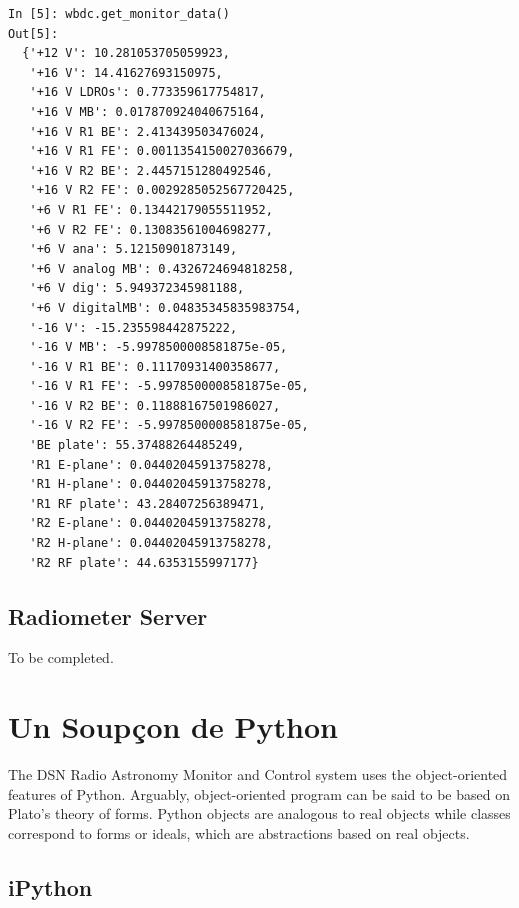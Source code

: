 \documentclass[letterpaper,11pt]{book}
\begin{document}
\begin{verbatim}
In [5]: wbdc.get_monitor_data()
Out[5]: 
  {'+12 V': 10.281053705059923,
   '+16 V': 14.41627693150975,
   '+16 V LDROs': 0.773359617754817,
   '+16 V MB': 0.017870924040675164,
   '+16 V R1 BE': 2.413439503476024,
   '+16 V R1 FE': 0.0011354150027036679,
   '+16 V R2 BE': 2.4457151280492546,
   '+16 V R2 FE': 0.0029285052567720425,
   '+6 V R1 FE': 0.13442179055511952,
   '+6 V R2 FE': 0.13083561004698277,
   '+6 V ana': 5.12150901873149,
   '+6 V analog MB': 0.4326724694818258,
   '+6 V dig': 5.949372345981188,
   '+6 V digitalMB': 0.04835345835983754,
   '-16 V': -15.235598442875222,
   '-16 V MB': -5.9978500008581875e-05,
   '-16 V R1 BE': 0.11170931400358677,
   '-16 V R1 FE': -5.9978500008581875e-05,
   '-16 V R2 BE': 0.11888167501986027,
   '-16 V R2 FE': -5.9978500008581875e-05,
   'BE plate': 55.37488264485249,
   'R1 E-plane': 0.04402045913758278,
   'R1 H-plane': 0.04402045913758278,
   'R1 RF plate': 43.28407256389471,
   'R2 E-plane': 0.04402045913758278,
   'R2 H-plane': 0.04402045913758278,
   'R2 RF plate': 44.6353155997177}\end{verbatim}


\section{Radiometer Server}

To be completed.

\appendix

\chapter{Un Soup\c{c}on de Python}\label{Python}

The DSN Radio Astronomy Monitor and Control system uses the object-oriented
features of Python.  Arguably, object-oriented program can be said to be based
on Plato's theory of forms.  Python objects are analogous to real objects
while classes correspond to forms or ideals, which are abstractions based on
real objects.

\section{iPython}
\end{document}
